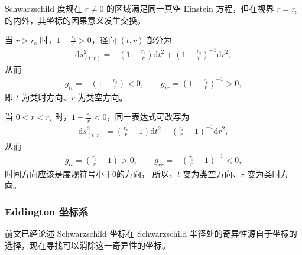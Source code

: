 \begin{derivationnote}
Schwarzschild 度规在 $r\neq 0$ 的区域满足同一真空 Einstein 方程，但在视界 $r=r_{\mathrm{s}}$ 的内外，其坐标的因果意义发生交换。

当 $r>r_{\mathrm{s}}$ 时，$1-\frac{r_{\mathrm{s}}}{r}>0$，径向 $(t,r)$ 部分为
\begin{align}
\mathrm{d}s^{2}_{(t,r)}
=
- \left(1-\frac{r_{\mathrm{s}}}{r}\right)\mathrm{d}t^{2}
+ \left(1-\frac{r_{\mathrm{s}}}{r}\right)^{-1}\mathrm{d}r^{2},
\end{align}
从而
\begin{align}
g_{tt}=-\left(1-\frac{r_{\mathrm{s}}}{r}\right)<0,
\qquad
g_{rr}=\left(1-\frac{r_{\mathrm{s}}}{r}\right)^{-1}>0,
\end{align}
即 $t$ 为类时方向、$r$ 为类空方向。

当 $0<r<r_{\mathrm{s}}$ 时，$1-\frac{r_{\mathrm{s}}}{r}<0$，同一表达式可改写为
\begin{align}
\mathrm{d}s^{2}_{(t,r)}
=
\left(\frac{r_{\mathrm{s}}}{r}-1\right)\mathrm{d}t^{2}
-
\left(\frac{r_{\mathrm{s}}}{r}-1\right)^{-1}\mathrm{d}r^{2},
\end{align}
从而
\begin{align}
g_{tt}=\left(\frac{r_{\mathrm{s}}}{r}-1\right)>0,
\qquad
g_{rr}=-\left(\frac{r_{\mathrm{s}}}{r}-1\right)^{-1}<0,
\end{align}
时间方向应该是度规符号小于0的方向， 所以，$t$ 变为类空方向、$r$ 变为类时方向。
\end{derivationnote}



\subsubsection{Eddington 坐标系}

前文已经论述 Schwarzschild 坐标在 Schwarzschild 半径处的奇异性源自于坐标的选择，现在寻找可以消除这一奇异性的坐标。

